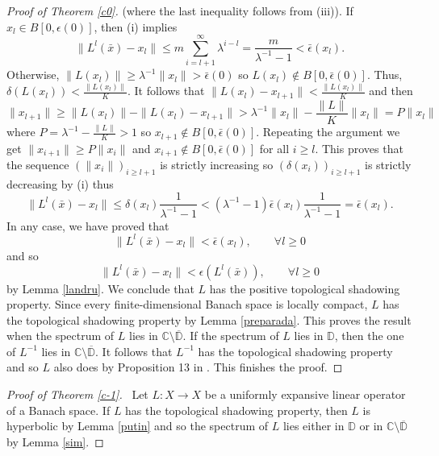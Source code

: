\documentclass[11pt,letterpaper]{amsart}
\numberwithin{equation}{section}
\begin{document}
\begin{proof}[Proof of Theorem \ref{c0}]
(where the last inequality follows from (iii)).
If $x_l\in B[0,\epsilon(0)]$, then (i) implies
$$
\|L^l(\bar{x})-x_l\|\leq m\sum_{i=l+1}^\infty\lambda^{i-l}=\frac{m}{\lambda^{-1}-1}<\bar{\epsilon}(x_l).
$$
Otherwise, $\|L(x_l)\|\geq \lambda^{-1}\|x_l\|>\bar{\epsilon}(0)$ so $L(x_l)\notin B[0,\bar{\epsilon}(0)]$. Thus,
$\delta(L(x_l))<\frac{\|L(x_l)\|}K$.
It follows that
$\|L(x_l)-x_{l+1}\|< \frac{\|L(x_l)\|}K$ and then
$$
\|x_{l+1}\|\geq \|L(x_l)\|-\|L(x_l)-x_{l+1}\|> \lambda^{-1}\|x_l\|-\frac{\|L\|}K\|x_l\|=P\|x_l\|
$$
where $P=\lambda^{-1}-\frac{\|L\|}K>1$ so $x_{l+1}\notin B[0,\bar{\epsilon}(0)]$.
Repeating the argument we get $\|x_{i+1}\|\geq P\|x_i\|$ and $x_{i+1}\notin B[0,\bar{\epsilon}(0)]$ for all $i\geq l$.
This proves that the sequence $(\|x_i\|)_{i\geq l+1}$ is strictly increasing so
$(\delta(x_i))_{i\geq l+1}$ is strictly decreasing by (i) thus
$$
\|L^l(\bar{x})-x_l\|\leq \delta(x_l)\frac{1}{\lambda^{-1}-1}<(\lambda^{-1}-1)\bar{\epsilon}(x_l)\frac{1}{\lambda^{-1}-1}=\bar{\epsilon}(x_l).
$$
In any case, we have proved that
$$
\|L^l(\bar{x})-x_l\|<\bar{\epsilon}(x_l),\quad\quad\forall l\geq0
$$
and so
$$
\|L^l(\bar{x})-x_l\|<\epsilon(L^l(\bar{x})),
\quad\quad
\forall l\geq0
$$
by Lemma \ref{landru}.
We conclude that $L$ has the positive topological shadowing property.
Since every finite-dimensional Banach space is locally compact, $L$ has the topological shadowing property by Lemma \ref{preparada}.
This proves the result when the spectrum of $L$ lies in $\mathbb{C}\setminus \overline{\mathbb{D}}$.
If the spectrum of $L$ lies in $\mathbb{D}$, then
the one of $L^{-1}$ lies in $\mathbb{C}\setminus \overline{\mathbb{D}}$.
It follows that $L^{-1}$ has the topological shadowing property and so $L$ also does by Proposition 13 in \cite{dlrw}. This finishes the proof.
\end{proof}



\begin{proof}[Proof of Theorem \ref{c-1}]\,
Let $L:X\to X$ be a uniformly expansive linear operator of a Banach space. If $L$ has the topological shadowing property,
then $L$ is hyperbolic by Lemma \ref{putin} and so
the spectrum of $L$ lies either in $\mathbb{D}$ or in $\mathbb{C}\setminus \overline{\mathbb{D}}$ by Lemma \ref{sim}.
\end{proof}
\end{document}
